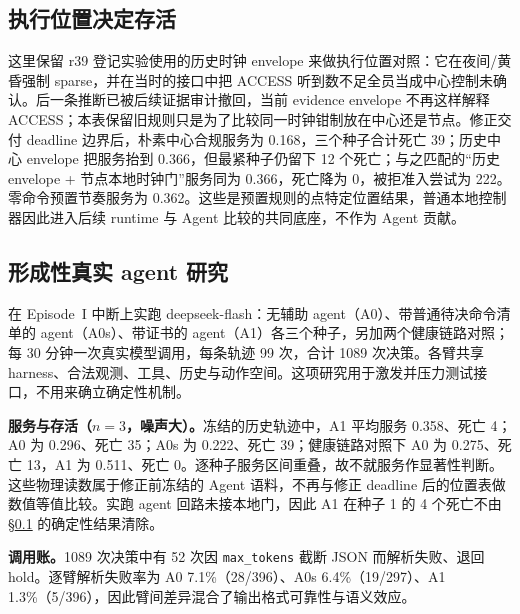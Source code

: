\documentclass[11pt]{article}
\begin{document}
\subsection{执行位置决定存活}
\label{sec:eval-place}
这里保留 r39 登记实验使用的历史时钟 envelope 来做执行位置对照：它在夜间/黄昏强制 sparse，并在当时的接口中把 ACCESS 听到数不足全员当成中心控制未确认。后一条推断已被后续证据审计撤回，当前 evidence envelope 不再这样解释 ACCESS；本表保留旧规则只是为了比较同一时钟钳制放在中心还是节点。修正交付 deadline 边界后，朴素中心合规服务为 0.168，三个种子合计死亡 39；历史中心 envelope 把服务抬到 0.366，但最紧种子仍留下 12 个死亡；与之匹配的“历史 envelope + 节点本地时钟门”服务同为 0.366，死亡降为 0，被拒准入尝试为 222。零命令预置节奏服务为 0.362。这些是预置规则的点特定位置结果，普通本地控制器因此进入后续 runtime 与 Agent 比较的共同底座，不作为 Agent 贡献。

\begin{table}[t]
\centering\small
\caption{确定性 Episode~I 执行位置研究（无 LLM）。登记的中心臂使用历史时钟 envelope；匹配的“历史 envelope + 本地门”在服务同为 0.366 时把所测永久死亡全部消除。被拒命令在准入处退回、从未发出。点特定经验结果，不是生存不变量或最优界。}
\label{tab:r39}
\setlength{\tabcolsep}{4pt}

\end{table}

\subsection{形成性真实 agent 研究}
\label{sec:eval-agent}
在 Episode~I 中断上实跑 deepseek-flash：无辅助 agent（A0）、带普通待决命令清单的 agent（A0s）、带证书的 agent（A1）各三个种子，另加两个健康链路对照；每 30 分钟一次真实模型调用，每条轨迹 99 次，合计 1089 次决策。各臂共享 harness、合法观测、工具、历史与动作空间。这项研究用于激发并压力测试接口，不用来确立确定性机制。

\textbf{服务与存活（$n{=}3$，噪声大）。}冻结的历史轨迹中，A1 平均服务 0.358、死亡 4；A0 为 0.296、死亡 35；A0s 为 0.222、死亡 39；健康链路对照下 A0 为 0.275、死亡 13，A1 为 0.511、死亡 0。逐种子服务区间重叠，故不就服务作显著性判断。这些物理读数属于修正前冻结的 Agent 语料，不再与修正 deadline 后的位置表做数值等值比较。实跑 agent 回路未接本地门，因此 A1 在种子 1 的 4 个死亡不由 \S\ref{sec:eval-place} 的确定性结果清除。

\textbf{调用账。}1089 次决策中有 52 次因 \texttt{max\_tokens} 截断 JSON 而解析失败、退回 hold。逐臂解析失败率为 A0 7.1\%（28/396）、A0s 6.4\%（19/297）、A1 1.3\%（5/396），因此臂间差异混合了输出格式可靠性与语义效应。
\end{document}
